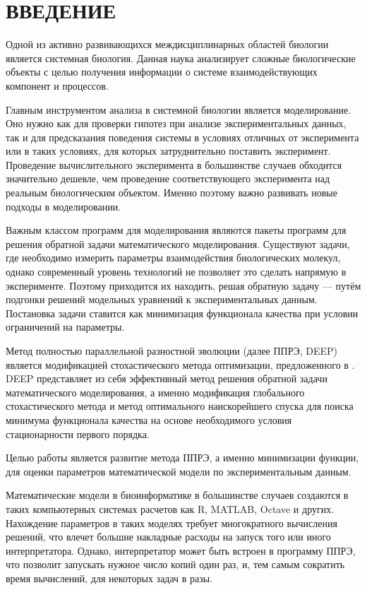 \chapter*{ВВЕДЕНИЕ}

Одной из активно развивающихся междисциплинарных областей биологии является системная биология. 
Данная наука анализирует сложные биологические объекты с целью получения информации о системе взаимодействующих компонент и процессов.

Главным инструментом анализа в системной биологии является моделирование.
Оно нужно как для проверки гипотез при анализе экспериментальных данных, так и для предсказания поведения системы в условиях отличных от эксперимента или в таких условиях, для которых затруднительно поставить эксперимент.
Проведение вычислительного эксперимента в большинстве случаев обходится значительно дешевле, чем проведение соответствующего эксперимента над реальным биологическим объектом.
Именно поэтому важно развивать новые подходы в моделировании.

Важным классом программ для моделирования являются пакеты программ для решения обратной задачи математического моделирования.
Существуют задачи, где необходимо измерить параметры взаимодействия биологических молекул, однако современный уровень технологий не позволяет это сделать напрямую в эксперименте.
Поэтому приходится их находить, решая обратную задачу --- путём подгонки решений модельных уравнений к экспериментальных данным.
Постановка задачи ставится как минимизация функционала качества при условии ограничений на параметры.

Метод полностью параллельной разностной эволюции (далее ППРЭ, DEEP) \cite{Kozlov11, Kozlov13} является модификацией стохастического метода оптимизации, предложенного в \cite{Storn95}.
DEEP представляет из себя эффективный метод решения обратной задачи математического моделирования, а именно модификация глобального стохастического метода и метод оптимального наискорейшего спуска для поиска минимума функционала качества на основе необходимого условия стационарности первого порядка.

Целью работы является развитие метода ППРЭ, а именно минимизации функции, для оценки параметров математической модели по экспериментальным данным.

Математические модели в биоинформатике в большинстве случаев создаются в таких компьютерных системах расчетов как R, MATLAB, Octave и других.
Нахождение параметров в таких моделях требует многократного вычисления решений, что влечет большие накладные расходы на запуск того или иного интерпретатора. Однако, интерпретатор может быть встроен в программу ППРЭ, что позволит запускать нужное число копий один раз, и, тем самым сократить время вычислений, для некоторых задач в разы.


